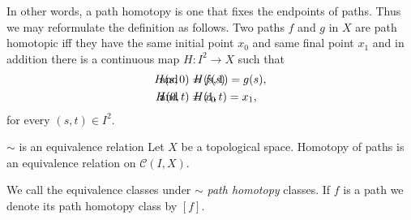 In other words, a path homotopy is one that fixes the endpoints of  paths. Thus we may reformulate the definition as follows. Two paths \(f\) and \(g\) in \(X\) are path homotopic iff they have the same initial point \(x_0\) and same final point \(x_1\) and in addition there is a continuous map \(H\colon I^2 \to X\) such that \begin{align*}
    H(s,0) &= f(s)&& \hspace{-2.5cm}\text{ and }\quad H(s,1) = g(s),\\
    H(0,t) &= x_0 && \hspace{-2.5cm}\text{ and }\quad H(1,t) = x_1,
\end{align*}
for every \((s,t)\in I^2\). 

\begin{theorem}{\(\sim\) is an equivalence relation}{}
    Let \(X\) be a topological space. Homotopy of paths is an equivalence relation on \(\mathcal{C}(I,X)\).
\end{theorem}

\begin{remark}
    We call the equivalence classes under \(\sim\) \textit{path homotopy} classes. If \(f\) is a path we  denote its path homotopy class by \([f]\).
\end{remark}

